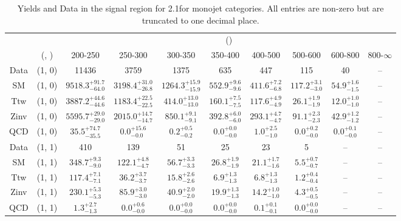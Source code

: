 \begin{table}[h!]
\tiny
\centering
\caption{Yields and Data in the signal region for 2.1\ifb for monojet categories. All entries are non-zero but are truncated to one decimal place.\label{tab:yieldsallqcd_sig_comb_mono}}
\begin{tabular}
{cccccccccc}
	\hline\hline
	&	& \multicolumn{8}{c}{\scalht (\gev)}\\ 
	&	 (\njet, \nb) & 200-250 & 250-300 & 300-350 & 350-400 & 400-500 & 500-600 & 600-800 & 800-$\infty$ \\ [0.8ex] 
\hline
	Data & (1, 0) & 11436 & 3759 & 1375 & 635 & 447 & 115 & 40 & -- \\[0.5ex] 
	SM & (1, 0) & $9518.3^{+ 91.7 }_{- 64.0 }$ & $3198.4^{+ 31.0 }_{- 26.8 }$ & $1264.3^{+ 15.9 }_{- 15.9 }$ & $552.9^{+ 9.6 }_{- 9.6 }$ & $411.6^{+ 7.2 }_{- 6.8 }$ & $117.2^{+ 3.1 }_{- 3.0 }$ & $54.9^{+ 1.6 }_{- 1.5 }$ & -- \\[0.5ex] 
	Ttw & (1, 0) & $3887.2^{+ 44.6 }_{- 44.6 }$ & $1183.4^{+ 22.5 }_{- 22.5 }$ & $414.0^{+ 13.0 }_{- 13.0 }$ & $160.1^{+ 7.5 }_{- 7.5 }$ & $117.6^{+ 4.9 }_{- 4.9 }$ & $26.1^{+ 1.9 }_{- 1.9 }$ & $12.0^{+ 1.0 }_{- 1.0 }$ & -- \\[0.5ex] 
	Zinv & (1, 0) & $5595.7^{+ 29.0 }_{- 29.0 }$ & $2015.0^{+ 14.7 }_{- 14.7 }$ & $850.1^{+ 9.1 }_{- 9.1 }$ & $392.8^{+ 6.0 }_{- 6.0 }$ & $293.1^{+ 4.7 }_{- 4.7 }$ & $91.1^{+ 2.3 }_{- 2.3 }$ & $42.9^{+ 1.2 }_{- 1.2 }$ & -- \\[0.5ex] 
	QCD & (1, 0) & $35.5^{+ 74.7 }_{- 35.5 }$ & $0.0^{+ 15.6 }_{- 0.0 }$ & $0.2^{+ 0.5 }_{- 0.2 }$ & $0.0^{+ 0.0 }_{- 0.0 }$ & $1.0^{+ 2.5 }_{- 1.0 }$ & $0.0^{+ 0.2 }_{- 0.0 }$ & $0.0^{+ 0.1 }_{- 0.0 }$ & -- \\[0.5ex] 
	Data & (1, 1) & 410 & 139 & 51 & 25 & 23 & 5 & -- & -- \\[0.5ex] 
	SM & (1, 1) & $348.7^{+ 9.3 }_{- 9.0 }$ & $122.1^{+ 4.8 }_{- 4.7 }$ & $56.7^{+ 3.3 }_{- 3.3 }$ & $26.8^{+ 1.9 }_{- 1.9 }$ & $21.1^{+ 1.7 }_{- 1.6 }$ & $5.5^{+ 0.7 }_{- 0.7 }$ & -- & -- \\[0.5ex] 
	Ttw & (1, 1) & $117.4^{+ 7.1 }_{- 7.1 }$ & $36.2^{+ 3.7 }_{- 3.7 }$ & $15.8^{+ 2.6 }_{- 2.6 }$ & $6.9^{+ 1.3 }_{- 1.3 }$ & $6.8^{+ 1.3 }_{- 1.3 }$ & $1.2^{+ 0.4 }_{- 0.4 }$ & -- & -- \\[0.5ex] 
	Zinv & (1, 1) & $230.1^{+ 5.3 }_{- 5.3 }$ & $85.9^{+ 3.0 }_{- 3.0 }$ & $40.9^{+ 2.0 }_{- 2.0 }$ & $19.9^{+ 1.3 }_{- 1.3 }$ & $14.2^{+ 1.0 }_{- 1.0 }$ & $4.3^{+ 0.5 }_{- 0.5 }$ & -- & -- \\[0.5ex] 
	QCD & (1, 1) & $1.3^{+ 2.7 }_{- 1.3 }$ & $0.0^{+ 0.6 }_{- 0.0 }$ & $0.0^{+ 0.0 }_{- 0.0 }$ & $0.0^{+ 0.0 }_{- 0.0 }$ & $0.1^{+ 0.1 }_{- 0.1 }$ & $0.0^{+ 0.0 }_{- 0.0 }$ & -- & -- \\[0.5ex] 
	\hline
	\hline
\end{tabular}
\end{table}
